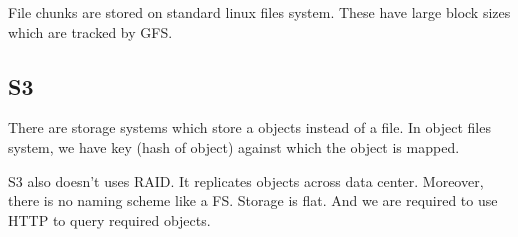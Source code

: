 \documentclass[twoside]{article}
\begin{document}
File chunks are stored on standard linux files system. These have large block sizes which are tracked by GFS.

\subsection{S3}
There are storage systems which store a objects instead of a file. In object files system, we have key (hash of object) against which the object is mapped. 

S3 also doesn't uses RAID. It replicates objects across data center. Moreover, there is no naming scheme like a FS. Storage is flat. And we are required to use HTTP to query required objects.
\end{document}
